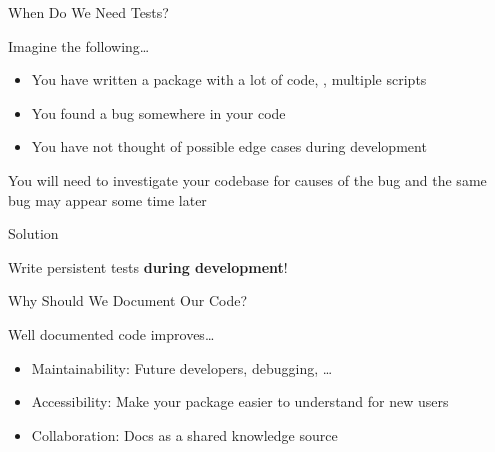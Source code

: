 

\begin{frame}{When Do We Need Tests?}
  \begin{center}
    \huge\textcolor{ccyan!90!cblack}{Imagine the following\dots}
  \end{center}
  \begin{itemize}
    \item You have written a package with a lot of code, \eg, multiple scripts
    \item You found a bug somewhere in your code
    \item You have not thought of possible edge cases during development
  \end{itemize}
  \vspace{1em}
  \begin{center}
    \huge\textcolor{cpink!90!cblack}{\to{} You will need to investigate your codebase for
    causes of the bug and the same bug may appear some time later}
  \end{center}
\end{frame}

\begin{frame}{Solution}
  \begin{center}
    \huge\textcolor{ccyan!90!cblack}{Write persistent tests \textbf{during development}!}\\
  \end{center}
\end{frame}


\begin{frame}{Why Should We Document Our Code?}
  \begin{center}
    \huge\textcolor{ccyan!90!cblack}{Well documented code improves\dots}
  \end{center}
  \begin{itemize}
    \item Maintainability: Future developers, debugging, \dots
    \item Accessibility: Make your package easier to understand for new users
    \item Collaboration: Docs as a shared knowledge source
  \end{itemize}
\end{frame}


